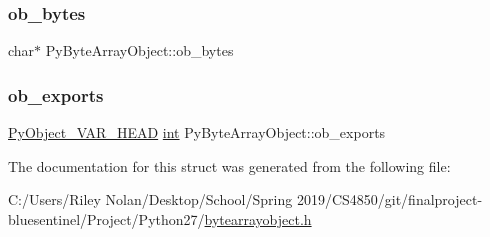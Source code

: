 \subsubsection{\texorpdfstring{ob\_bytes}{ob\_bytes}}
{\footnotesize\ttfamily char$\ast$ Py\+Byte\+Array\+Object\+::ob\+\_\+bytes}

\mbox{\label{struct_py_byte_array_object_a302f6ed193ac551931000971ac882169}} 
\subsubsection{\texorpdfstring{ob\_exports}{ob\_exports}}
{\footnotesize\ttfamily \mbox{\hyperlink{_python27_2object_8h_aa0eba161a76be8710b3de325c2e7f9e2}{Py\+Object\+\_\+\+V\+A\+R\+\_\+\+H\+E\+AD}} \mbox{\hyperlink{warnings_8h_a74f207b5aa4ba51c3a2ad59b219a423b}{int}} Py\+Byte\+Array\+Object\+::ob\+\_\+exports}



The documentation for this struct was generated from the following file\+:\begin{DoxyCompactItemize}
\item 
C\+:/\+Users/\+Riley Nolan/\+Desktop/\+School/\+Spring 2019/\+C\+S4850/git/finalproject-\/bluesentinel/\+Project/\+Python27/\mbox{\hyperlink{bytearrayobject_8h}{bytearrayobject.\+h}}\end{DoxyCompactItemize}
